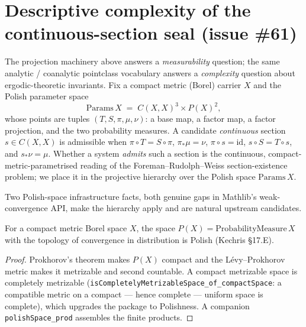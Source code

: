 \section{Descriptive complexity of the continuous-section seal (issue \#61)}

The projection machinery above answers a \emph{measurability} question; the same analytic /
coanalytic pointclass vocabulary answers a \emph{complexity} question about ergodic-theoretic
invariants. Fix a compact metric (Borel) carrier \(X\) and the Polish parameter space
\[
  \mathrm{Params}\,X \;=\; C(X,X)^3 \times P(X)^2,
\]
whose points are tuples \((T,S,\pi,\mu,\nu)\): a base map, a factor map, a factor projection, and the
two probability measures. A candidate \emph{continuous} section \(s \in C(X,X)\) is admissible when
\(\pi\circ T = S\circ\pi\), \(\pi_*\mu = \nu\), \(\pi\circ s = \mathrm{id}\), \(s\circ S = T\circ s\),
and \(s_*\nu = \mu\). Whether a system \emph{admits} such a section is the continuous,
compact-metric-parametrised reading of the Foreman--Rudolph--Weiss section-existence problem; we
place it in the projective hierarchy over the Polish space \(\mathrm{Params}\,X\).

Two Polish-space infrastructure facts, both genuine gaps in Mathlib's weak-convergence API, make the
hierarchy apply and are natural upstream candidates.

\begin{theorem}\label{thm:dst-pspace-polish}
  \leanok
  For a compact metric Borel space \(X\), the space \(P(X) = \mathrm{ProbabilityMeasure}\,X\) with the
  topology of convergence in distribution is Polish (Kechris \S17.E).
\end{theorem}
\begin{proof}\leanok
  Prokhorov's theorem makes \(P(X)\) compact and the L\'evy--Prokhorov metric makes it metrizable and
  second countable. A compact metrizable space is completely metrizable
  (\texttt{isCompletelyMetrizableSpace\_of\_compactSpace}: a compatible metric on a compact --- hence
  complete --- uniform space is complete), which upgrades the package to Polishness. A companion
  \texttt{polishSpace\_prod} assembles the finite products.
\end{proof}

